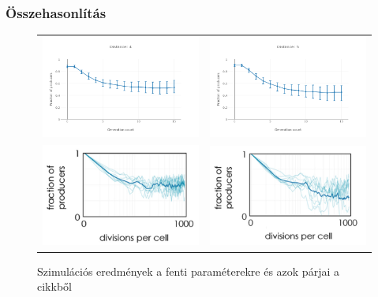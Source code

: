 \begin{frame}
	\frametitle{Összehasonlítás}
	\begin{figure}[h]
		\centering
		\begin{tabular}{cc}
			\includegraphics[width=0.4\linewidth]{images/dist4}
			&
			\includegraphics[width=0.4\linewidth]{images/dist5}
			\\
			\includegraphics[width=0.4\linewidth]{images/arc_dist4}
			&
			\includegraphics[width=0.4\linewidth]{images/arc_dist5}
			\\
		\end{tabular}
		\caption{Szimulációs eredmények a fenti paraméterekre és azok párjai a \cite{archetti2016cooperation} cikkből}
		\label{fig:DistChange}
	\end{figure}
\end{frame}

